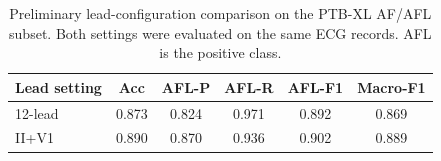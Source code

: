 \begin{table}[t]
\centering
\caption{Preliminary lead-configuration comparison on the PTB-XL AF/AFL subset. Both settings were evaluated on the same ECG records. AFL is the positive class.}
\label{tab:ptbxl_lead_comparison}
\begin{tabular}{lccccc}
\toprule
Lead setting & Acc & AFL-P & AFL-R & AFL-F1 & Macro-F1 \\
\midrule
12-lead & 0.873 & 0.824 & 0.971 & 0.892 & 0.869 \\
II+V1 & 0.890 & 0.870 & 0.936 & 0.902 & 0.889 \\
\bottomrule
\end{tabular}
\end{table}
